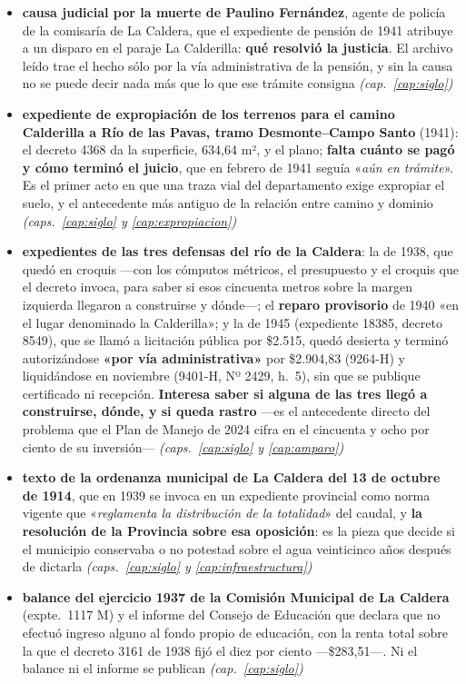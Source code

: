 \begin{itemize}[leftmargin=*]
\item \textbf{causa judicial por la muerte de Paulino Fernández}, agente de policía de la comisaría de La Caldera, que el expediente de pensión de 1941 atribuye a un disparo en el paraje La Calderilla: \textbf{qué resolvió la justicia}. El archivo leído trae el hecho sólo por la vía administrativa de la pensión, y sin la causa no se puede decir nada más que lo que ese trámite consigna \textit{(cap.\ \ref{cap:siglo})}
\item \textbf{expediente de expropiación de los terrenos para el camino Calderilla a Río de las Pavas, tramo Desmonte--Campo Santo} (1941): el decreto 4368 da la superficie, 634,64 m², y el plano; \textbf{falta cuánto se pagó y cómo terminó el juicio}, que en febrero de 1941 seguía «\textit{aún en trámite}». Es el primer acto en que una traza vial del departamento exige expropiar el suelo, y el antecedente más antiguo de la relación entre camino y dominio \textit{(caps.\ \ref{cap:siglo} y \ref{cap:expropiacion})}
\item \textbf{expedientes de las tres defensas del río de la Caldera}: la de 1938, que quedó en croquis ---con los cómputos métricos, el presupuesto y el croquis que el decreto invoca, para saber si esos cincuenta metros sobre la margen izquierda llegaron a construirse y dónde---; el \textbf{reparo provisorio} de 1940 «en el lugar denominado la Calderilla»; y la de 1945 (expediente 18385, decreto 8549), que se llamó a licitación pública por \$2.515, quedó desierta y terminó autorizándose \textbf{«por vía administrativa»} por \$2.904,83 (9264-H) y liquidándose en noviembre (9401-H, Nº 2429, h.\ 5), sin que se publique certificado ni recepción. \textbf{Interesa saber si alguna de las tres llegó a construirse, dónde, y si queda rastro} ---es el antecedente directo del problema que el Plan de Manejo de 2024 cifra en el cincuenta y ocho por ciento de su inversión--- \textit{(caps.\ \ref{cap:siglo} y \ref{cap:amparo})}
\item \textbf{texto de la ordenanza municipal de La Caldera del 13 de octubre de 1914}, que en 1939 se invoca en un expediente provincial como norma vigente que «\textit{reglamenta la distribución de la totalidad}» del caudal, y \textbf{la resolución de la Provincia sobre esa oposición}: es la pieza que decide si el municipio conservaba o no potestad sobre el agua veinticinco años después de dictarla \textit{(caps.\ \ref{cap:siglo} y \ref{cap:infraestructura})}
\item \textbf{balance del ejercicio 1937 de la Comisión Municipal de La Caldera} (expte.\ 1117 M) y el informe del Consejo de Educación que declara que no efectuó ingreso alguno al fondo propio de educación, con la renta total sobre la que el decreto 3161 de 1938 fijó el diez por ciento ---\$283,51---. Ni el balance ni el informe se publican \textit{(cap.\ \ref{cap:siglo})}

\end{itemize}
